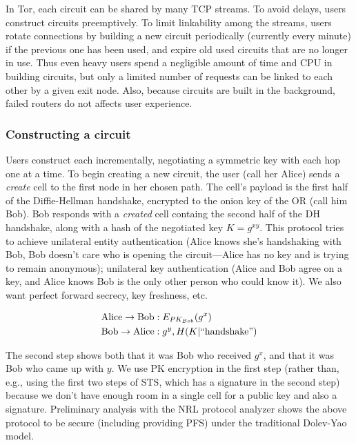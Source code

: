 \documentclass[times,10pt,twocolumn]{article}
\begin{document}
In Tor, each circuit can be shared by many TCP streams.  To avoid
delays, users construct circuits preemptively.  To limit linkability
among the streams, users rotate connections by building a new circuit
periodically (currently every minute) if the previous one has been
used, and expire old used circuits that are no longer in use. Thus
even heavy users spend a negligible amount of time and CPU in
building circuits, but only a limited number of requests can be linked
to each other by a given exit node. Also, because circuits are built
in the background, failed routers do not affects user experience.

\subsubsection{Constructing a circuit}

Users construct each incrementally, negotiating a symmetric key with
each hop one at a time. To begin creating a new circuit, the user
(call her Alice) sends a \emph{create} cell to the first node in her
chosen path. The cell's payload is the first half of the
Diffie-Hellman handshake, encrypted to the onion key of the OR (call
him Bob). Bob responds with a \emph{created} cell containg the second
half of the DH handshake, along with a hash of the negotiated key
$K=g^{xy}$.  This protocol tries to achieve unilateral entity
authentication (Alice knows she's handshaking with Bob, Bob doesn't
care who is opening the circuit---Alice has no key and is trying to
remain anonymous); unilateral key authentication (Alice and Bob
agree on a key, and Alice knows Bob is the only other person who could
know it).  We also want perfect forward
secrecy, key freshness, etc.

\begin{equation}
\begin{aligned}
\mathrm{Alice} \rightarrow \mathrm{Bob}&: E_{PK_{Bob}}(g^x) \\
\mathrm{Bob} \rightarrow \mathrm{Alice}&: g^y, H(K | \mathrm{``handshake"}) \\
\end{aligned}
\end{equation}

The second step shows both that it was Bob
who received $g^x$, and that it was Bob who came up with $y$. We use
PK encryption in the first step (rather than, e.g., using the first two
steps of STS, which has a signature in the second step) because we
don't have enough room in a single cell for a public key and also a
signature. Preliminary analysis with the NRL protocol analyzer \cite{meadows96}
shows the above protocol to be secure (including providing PFS) under the
traditional Dolev-Yao model.
\end{document}
